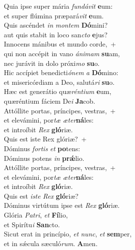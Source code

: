 \evenverse Quia ipse super mária \textit{fun}\textit{dá}\textit{vit} \textbf{e}um:~\*\\
\evenverse et super flúmina præpará\textit{vit} \textbf{e}um.\\
\oddverse Quis ascéndet \textit{in} \textit{mon}\textit{tem} \textbf{Dó}mini?~\*\\
\oddverse aut quis stabit in loco san\textit{cto} \textbf{e}jus?\\
\evenverse Innocens mánibus et mundo corde,~+\\
\evenverse  qui non accépit in vano \textit{á}\textit{ni}\textit{mam} \textbf{su}am,~\*\\
\evenverse nec jurávit in dolo próxi\textit{mo} \textbf{su}o.\\
\oddverse Hic accípiet benedicti\textit{ó}\textit{nem} \textit{a} \textbf{Dó}mino:~\*\\
\oddverse et misericórdiam a Deo, salutá\textit{ri} \textbf{su}o.\\
\evenverse Hæc est generátio quæ\textit{rén}\textit{ti}\textit{um} \textbf{e}um,~\*\\
\evenverse quæréntium fáciem De\textit{i} \textbf{Ja}cob.\\
\oddverse Attóllite portas, príncipes, vestras,~+\\
\oddverse  et elevámini, por\textit{tæ} \textit{æ}\textit{ter}\textbf{ná}les:~\*\\
\oddverse et introíbit \textit{Rex} \textbf{gló}riæ.\\
\evenverse Quis est iste Rex glóriæ?~+\\
\evenverse  Dóminus \textit{for}\textit{tis} \textit{et} \textbf{po}tens:~\*\\
\evenverse Dóminus potens \textit{in} \textbf{prǽ}lio.\\
\oddverse Attóllite portas, príncipes, vestras,~+\\
\oddverse  et elevámini, por\textit{tæ} \textit{æ}\textit{ter}\textbf{ná}les:~\*\\
\oddverse et introíbit \textit{Rex} \textbf{gló}riæ.\\
\evenverse Quis est \textit{i}\textit{ste} \textit{Rex} \textbf{gló}riæ?~\*\\
\evenverse Dóminus virtútum ipse est \textit{Rex} \textbf{gló}riæ.\\
\oddverse Glória \textit{Pa}\textit{tri}, \textit{et} \textbf{Fí}lio,~\*\\
\oddverse et Spirítu\textit{i} \textbf{San}cto.\\
\evenverse Sicut erat in princípio, \textit{et} \textit{nunc}, \textit{et} \textbf{sem}per,~\*\\
\evenverse et in sǽcula sæculó\textit{rum}. \textbf{A}men.\\
